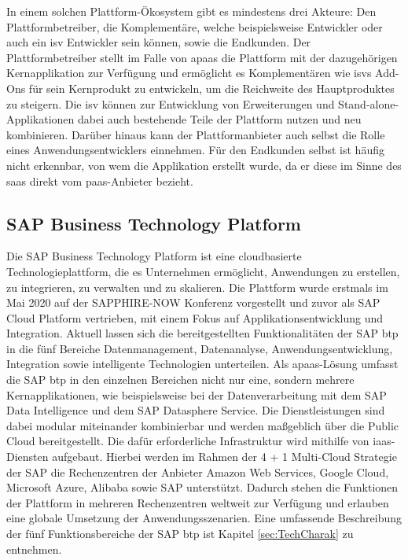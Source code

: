 In einem solchen Plattform-Ökosystem gibt es mindestens drei Akteure: Den Plattformbetreiber, die Komplementäre, welche beispielsweise Entwickler oder auch ein \ac{isv} Entwickler sein können, sowie die Endkunden. Der Plattformbetreiber stellt im Falle von \ac{apaas} die Plattform mit der dazugehörigen Kernapplikation zur Verfügung und ermöglicht es Komplementären wie \ac{isv}s Add-Ons für sein Kernprodukt zu entwickeln, um die Reichweite des Hauptproduktes zu steigern. Die \ac{isv} können zur Entwicklung von Erweiterungen und Stand-alone-Applikationen dabei auch bestehende Teile der Plattform nutzen und neu kombinieren. Darüber hinaus kann der Plattformanbieter auch selbst die Rolle eines Anwendungsentwicklers einnehmen.\autocite[Vgl.][S. 444f]{FOERDERER2018} Für den Endkunden selbst ist häufig nicht erkennbar, von wem die Applikation erstellt wurde, da er diese im Sinne des \ac{saas} direkt vom \ac{paas}-Anbieter bezieht. \autocite[Vgl.][S. 372]{BEIMBORN2011}

\subsection{SAP Business Technology Platform}

Die SAP Business Technology Platform ist eine cloudbasierte Technologieplattform, die es Unternehmen ermöglicht, Anwendungen zu erstellen, zu integrieren, zu verwalten und zu skalieren. Die Plattform wurde erstmals im Mai 2020 auf der SAPPHIRE-NOW Konferenz vorgestellt und zuvor als SAP Cloud Platform vertrieben, mit einem Fokus auf Applikationsentwicklung und Integration.\autocite[Vgl.][S. 2]{PREUSS2021}  Aktuell lassen sich die bereitgestellten Funktionalitäten der SAP \ac{btp} in die fünf Bereiche Datenmanagement, Datenanalyse, Anwendungsentwicklung, Integration sowie intelligente Technologien unterteilen. Als \ac{apaas}-Lösung umfasst die SAP \ac{btp} in den einzelnen Bereichen nicht nur eine, sondern mehrere Kernapplikationen, wie beispielsweise bei der Datenverarbeitung mit dem SAP Data Intelligence und dem SAP Datasphere Service. Die Dienstleistungen sind dabei modular miteinander kombinierbar und werden maßgeblich über die Public Cloud bereitgestellt. Die dafür erforderliche Infrastruktur wird mithilfe von \ac{iaas}-Diensten aufgebaut. Hierbei werden im Rahmen der 4 + 1 Multi-Cloud Strategie der SAP die Rechenzentren der Anbieter Amazon Web Services, Google Cloud, Microsoft Azure, Alibaba sowie SAP unterstützt. Dadurch stehen die Funktionen der Plattform in mehreren Rechenzentren weltweit zur Verfügung und erlauben eine globale Umsetzung der Anwendungsszenarien.\autocite[Vgl.][S. 57-59]{SEUBERT} Eine umfassende Beschreibung der fünf Funktionsbereiche der SAP \ac{btp} ist Kapitel \ref{sec:TechCharak} zu entnehmen.


